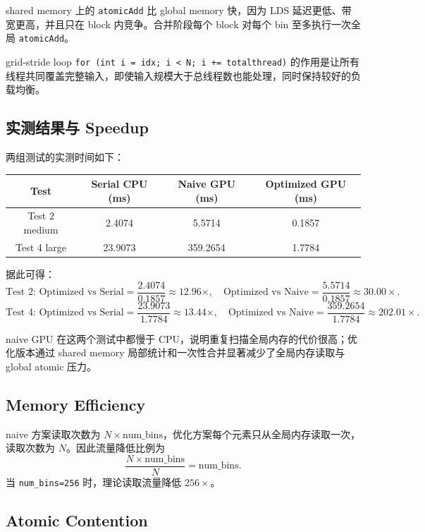 \documentclass[UTF8,a4paper,12pt,fontset=none]{ctexart}
\begin{document}
shared memory 上的 \texttt{atomicAdd} 比 global memory 快，因为 LDS 延迟更低、带宽更高，并且只在 block 内竞争。合并阶段每个 block 对每个 bin 至多执行一次全局 \texttt{atomicAdd}。

grid-stride loop \texttt{for (int i = idx; i < N; i += totalthread)} 的作用是让所有线程共同覆盖完整输入，即使输入规模大于总线程数也能处理，同时保持较好的负载均衡。

\subsection{实测结果与 Speedup}

两组测试的实测时间如下：

\begin{center}
\begin{tabular}{cccc}
\toprule
Test & Serial CPU (ms) & Naive GPU (ms) & Optimized GPU (ms) \\
\midrule
Test 2 medium & 2.4074  & 5.5714   & 0.1857 \\
Test 4 large  & 23.9073 & 359.2654 & 1.7784 \\
\bottomrule
\end{tabular}
\end{center}

据此可得：
\[
  \text{Test 2: Optimized vs Serial}=\frac{2.4074}{0.1857}\approx12.96\times,
  \quad
  \text{Optimized vs Naive}=\frac{5.5714}{0.1857}\approx30.00\times.
\]
\[
  \text{Test 4: Optimized vs Serial}=\frac{23.9073}{1.7784}\approx13.44\times,
  \quad
  \text{Optimized vs Naive}=\frac{359.2654}{1.7784}\approx202.01\times.
\]

naive GPU 在这两个测试中都慢于 CPU，说明重复扫描全局内存的代价很高；优化版本通过 shared memory 局部统计和一次性合并显著减少了全局内存读取与 global atomic 压力。

\subsection{Memory Efficiency}

naive 方案读取次数为 $N\times\text{num\_bins}$，优化方案每个元素只从全局内存读取一次，读取次数为 $N$。因此流量降低比例为
\[
  \frac{N\times\text{num\_bins}}{N}=\text{num\_bins}.
\]
当 \texttt{num\_bins=256} 时，理论读取流量降低 $256\times$。

\subsection{Atomic Contention}
\end{document}
